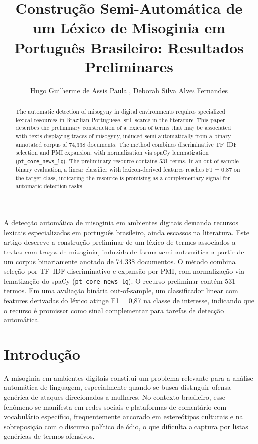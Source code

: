 \documentclass[12pt]{article}
\title{Constru\c{c}\~ao Semi-Autom\'atica de um L\'exico de Misoginia em
       Portugu\^es Brasileiro: Resultados Preliminares}
\author{Hugo Guilherme de Assis Paula\inst{1}
  , Deborah Silva Alves Fernandes\inst{1}}
\begin{document}
\maketitle

\begin{resumo}
A detec\c{c}\~ao autom\'atica de misoginia em ambientes digitais demanda
recursos lexicais especializados em portugu\^es brasileiro, ainda escassos
na literatura. Este artigo descreve a constru\c{c}\~ao preliminar de um
l\'exico de termos associados a textos com tra\c{c}os de misoginia, induzido
de forma semi-autom\'atica a partir de um corpus binariamente anotado de
74.338 documentos. O m\'etodo combina sele\c{c}\~ao por TF--IDF
discriminativo e expans\~ao por PMI, com normaliza\c{c}\~ao via
lematiza\c{c}\~ao do spaCy (\texttt{pt\_core\_news\_lg}). O recurso
preliminar cont\'em 531 termos. Em uma avalia\c{c}\~ao bin\'aria
out-of-sample, um classificador linear com features derivadas do l\'exico
atinge F1 = 0,87 na classe de interesse, indicando que o recurso \'e
promissor como sinal complementar para tarefas de detec\c{c}\~ao
autom\'atica.
\end{resumo}

\begin{abstract}
The automatic detection of misogyny in digital environments requires
specialized lexical resources in Brazilian Portuguese, still scarce in the
literature. This paper describes the preliminary construction of a lexicon
of terms that may be associated with texts displaying traces of misogyny,
induced semi-automatically from a binary-annotated corpus of 74,338
documents. The method combines discriminative TF--IDF selection and PMI
expansion, with normalization via spaCy lemmatization
(\texttt{pt\_core\_news\_lg}). The preliminary resource contains 531 terms.
In an out-of-sample binary evaluation, a linear classifier with
lexicon-derived features reaches F1 = 0.87 on the target class, indicating
the resource is promising as a complementary signal for automatic detection
tasks.
\end{abstract}

\section{Introdu\c{c}\~ao}

A misoginia em ambientes digitais constitui um problema relevante para a
an\'alise autom\'atica de linguagem, especialmente quando se busca
distinguir ofensa gen\'erica de ataques direcionados a mulheres. No
contexto brasileiro, esse fen\^omeno se manifesta em redes sociais e
plataformas de coment\'ario com vocabul\'ario espec\'ifico, frequentemente
ancorado em estere\'otipos culturais e na sobreposi\c{c}\~ao com o discurso
pol\'itico de \'odio, o que dificulta a captura por listas gen\'ericas de
termos ofensivos.
\end{document}
